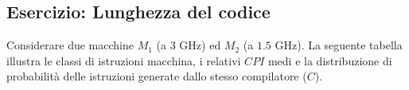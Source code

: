 \documentclass{article}
\begin{document}
    
    
    

    
    
    

    
    
    \subsection{Esercizio: Lunghezza del codice}
    
    Considerare due macchine $M_1$ (a $3$ GHz) ed $M_2$ (a $1.5$ GHz). La seguente tabella illustra le classi di istruzioni macchina, i relativi $CPI$ medi e la distribuzione di probabilità delle istruzioni generate dallo stesso compilatore ($C$).
    
\end{document}
